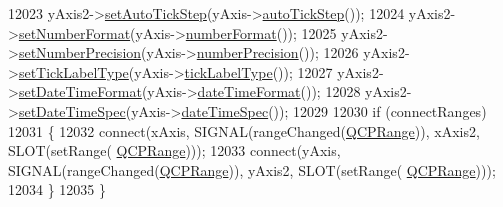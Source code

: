 \begin{DoxyCode}
12023   yAxis2->\hyperlink{class_q_c_p_axis_a99fe77b034e06f5b723995beab96e741}{setAutoTickStep}(yAxis->\hyperlink{class_q_c_p_axis_ae762920261b0c24beb56b893e5a2471d}{autoTickStep}());
12024   yAxis2->\hyperlink{class_q_c_p_axis_ae585a54dc2aac662e90a2ca82f002590}{setNumberFormat}(yAxis->\hyperlink{class_q_c_p_axis_ae6729b40845b29ffa5a440aa53cec215}{numberFormat}());
12025   yAxis2->\hyperlink{class_q_c_p_axis_a21dc8023ad7500382ad9574b48137e63}{setNumberPrecision}(yAxis->\hyperlink{class_q_c_p_axis_a91cb2825060ac79a889296377fe0c7c1}{numberPrecision}());
12026   yAxis2->\hyperlink{class_q_c_p_axis_a54f24f5ce8feea25209388a863d7e448}{setTickLabelType}(yAxis->\hyperlink{class_q_c_p_axis_a8a6f58a1ce12cfc4fadd379167668e8d}{tickLabelType}());
12027   yAxis2->\hyperlink{class_q_c_p_axis_a2ee0191daa03524a682113e63e05f7a7}{setDateTimeFormat}(yAxis->\hyperlink{class_q_c_p_axis_a132b54ae184a12ed24c9af24f53dc70b}{dateTimeFormat}());
12028   yAxis2->\hyperlink{class_q_c_p_axis_a262e06731debed7eee11fa6a81d67eaf}{setDateTimeSpec}(yAxis->\hyperlink{class_q_c_p_axis_afdd04c56ed29a9d948f840fc76f0d383}{dateTimeSpec}());
12029   
12030   \textcolor{keywordflow}{if} (connectRanges)
12031   \{
12032     connect(xAxis, SIGNAL(rangeChanged(\hyperlink{class_q_c_p_range}{QCPRange})), xAxis2, SLOT(setRange(
      \hyperlink{class_q_c_p_range}{QCPRange})));
12033     connect(yAxis, SIGNAL(rangeChanged(\hyperlink{class_q_c_p_range}{QCPRange})), yAxis2, SLOT(setRange(
      \hyperlink{class_q_c_p_range}{QCPRange})));
12034   \}
12035 \}
\end{DoxyCode}


